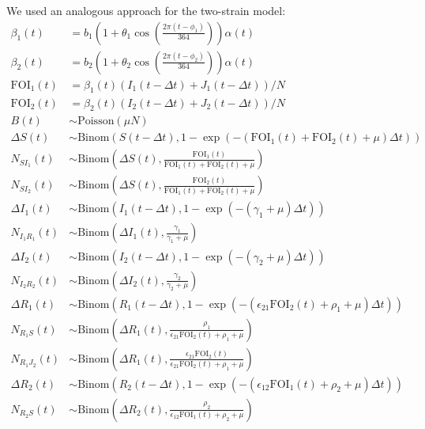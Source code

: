 \documentclass[12pt]{article}
\begin{document}
We used an analogous approach for the two-strain model:
\begin{align}
\beta_1(t) &= b_1 \left(1 + \theta_1 \cos\left(\frac{2 \pi (t - \phi_1)}{364}\right)\right) \alpha(t)\\
\beta_2(t) &= b_2 \left(1 + \theta_2 \cos\left(\frac{2 \pi (t - \phi_2)}{364}\right)\right) \alpha(t)\\
\textrm{FOI}_1(t) &= \beta_1(t) (I_1(t- \Delta t) + J_1(t- \Delta t))/N\\
\textrm{FOI}_2(t) &= \beta_2(t) (I_2(t- \Delta t) + J_2(t- \Delta t))/N\\
B(t) &\sim \mathrm{Poisson}(\mu N)\\
\Delta S(t) &\sim \mathrm{Binom}\left(S(t-\Delta t), 1- \exp(-(\textrm{FOI}_1(t)+\textrm{FOI}_2(t) + \mu) \Delta t )\right) \\
N_{SI_1}(t) &\sim \mathrm{Binom}\left(\Delta S(t), \frac{\textrm{FOI}_1(t)}{\textrm{FOI}_1(t) + \textrm{FOI}_2(t) + \mu} \right)\\
N_{SI_2}(t) &\sim \mathrm{Binom}\left(\Delta S(t), \frac{\textrm{FOI}_2(t)}{\textrm{FOI}_1(t) + \textrm{FOI}_2(t) + \mu} \right)\\
\Delta I_1(t) &\sim \mathrm{Binom}\left(I_1(t-\Delta t), 1- \exp(-(\gamma_1 + \mu) \Delta t )\right) \\
N_{I_1R_1}(t) &\sim \mathrm{Binom}\left(\Delta I_1(t), \frac{\gamma_1}{\gamma_1 + \mu} \right)\\
\Delta I_2(t) &\sim \mathrm{Binom}\left(I_2(t-\Delta t), 1- \exp(-(\gamma_2 + \mu) \Delta t )\right) \\
N_{I_2R_2}(t) &\sim \mathrm{Binom}\left(\Delta I_2(t), \frac{\gamma_2}{\gamma_2 + \mu} \right)\\
\Delta R_1(t) &\sim \mathrm{Binom}\left(R_1(t-\Delta t), 1- \exp(-(\epsilon_{21} \textrm{FOI}_2(t) + \rho_1 + \mu) \Delta t )\right) \\
N_{R_1S}(t) &\sim \mathrm{Binom}\left(\Delta R_1(t), \frac{\rho_1}{\epsilon_{21} \textrm{FOI}_2(t) + \rho_1 + \mu} \right)\\
N_{R_1J_2}(t) &\sim \mathrm{Binom}\left(\Delta R_1(t), \frac{\epsilon_{21} \textrm{FOI}_2(t)}{\epsilon_{21} \textrm{FOI}_2(t) + \rho_1 + \mu} \right)\\
\Delta R_2(t) &\sim \mathrm{Binom}\left(R_2(t-\Delta t), 1- \exp(-(\epsilon_{12} \textrm{FOI}_1(t) + \rho_2 + \mu) \Delta t )\right) \\
N_{R_2S}(t) &\sim \mathrm{Binom}\left(\Delta R_2(t), \frac{\rho_2}{\epsilon_{12} \textrm{FOI}_1(t) + \rho_2 + \mu} \right)\\

\end{align}
\end{document}
